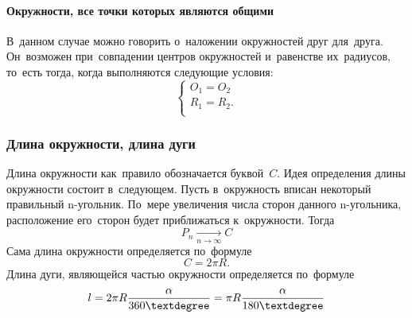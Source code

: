 \documentclass[]{scrartcl}
\begin{document}
\paragraph{Окружности, все точки которых являются общими}
В~данном случае можно говорить о~наложении окружностей друг для~друга. Он~возможен при~совпадении центров окружностей и~равенстве их~радиусов, то~есть тогда, когда выполняются следующие условия:
\begin{equation}\label{eq:two-circles-intersect-all-points}
\begin{cases}
O_{1}=O_{2}\\
R_{1}=R_{2}.\\
\end{cases}
\end{equation}

\subsubsection{Длина окружности, длина дуги}
Длина окружности как~правило обозначается буквой~${\textstyle C}$. Идея определения длины окружности состоит в~следующем. Пусть в~окружность вписан некоторый правильный n-угольник. По~мере увеличения числа сторон данного n-угольника, расположение его~сторон будет приближаться к~окружности. Тогда
\begin{equation}\label{eq:circle-lenght-1}
P_{n}\xrightarrow[n\to \infty]{} C 
\end{equation}
Сама длина окружности определяется по~формуле
\begin{equation}\label{eq:circle-lenght-2}
C=2 \pi R.
\end{equation}
Длина дуги, являющейся частью окружности определяется по~формуле
\begin{equation}\label{eq:circle-arc-lenght}
l = 2 \pi R \frac{\alpha}{360 \textdegree} = \pi R \frac{\alpha}{180 \textdegree}
\end{equation}
\end{document}
